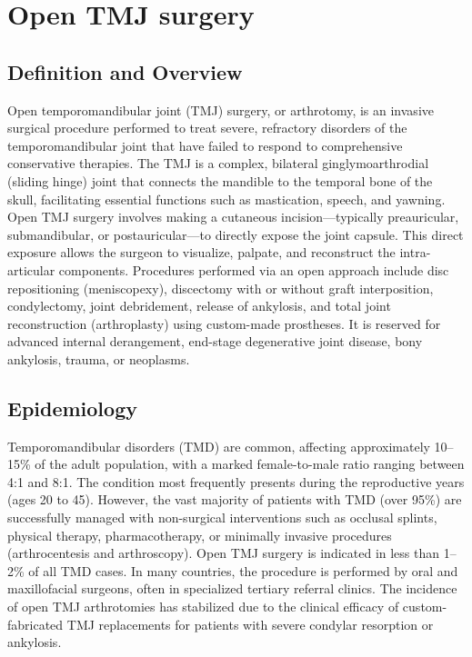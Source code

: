 \chapter{Open TMJ surgery}

\section*{Definition and Overview}
Open temporomandibular joint (TMJ) surgery, or arthrotomy, is an invasive surgical procedure performed to treat severe, refractory disorders of the temporomandibular joint that have failed to respond to comprehensive conservative therapies. The TMJ is a complex, bilateral ginglymoarthrodial (sliding hinge) joint that connects the mandible to the temporal bone of the skull, facilitating essential functions such as mastication, speech, and yawning. Open TMJ surgery involves making a cutaneous incision—typically preauricular, submandibular, or postauricular—to directly expose the joint capsule. This direct exposure allows the surgeon to visualize, palpate, and reconstruct the intra-articular components. Procedures performed via an open approach include disc repositioning (meniscopexy), discectomy with or without graft interposition, condylectomy, joint debridement, release of ankylosis, and total joint reconstruction (arthroplasty) using custom-made prostheses. It is reserved for advanced internal derangement, end-stage degenerative joint disease, bony ankylosis, trauma, or neoplasms.

\section*{Epidemiology}
Temporomandibular disorders (TMD) are common, affecting approximately 10--15\% of the adult population, with a marked female-to-male ratio ranging between 4:1 and 8:1. The condition most frequently presents during the reproductive years (ages 20 to 45). However, the vast majority of patients with TMD (over 95\%) are successfully managed with non-surgical interventions such as occlusal splints, physical therapy, pharmacotherapy, or minimally invasive procedures (arthrocentesis and arthroscopy). Open TMJ surgery is indicated in less than 1--2\% of all TMD cases. In many countries, the procedure is performed by oral and maxillofacial surgeons, often in specialized tertiary referral clinics. The incidence of open TMJ arthrotomies has stabilized due to the clinical efficacy of custom-fabricated TMJ replacements for patients with severe condylar resorption or ankylosis.

